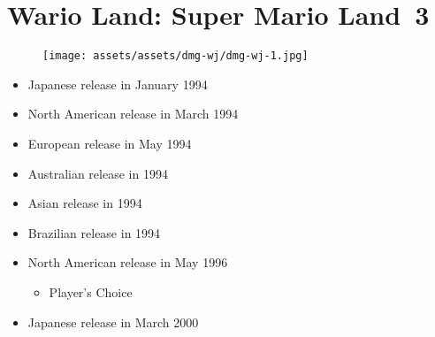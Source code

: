 \documentclass{book}
\begin{document}
\begingroup \chapter*{Wario Land: Super Mario Land 3} \endgroup
\begin{figure}[H]
\vskip 4pt
\centering
\texttt{[image: assets/assets/dmg-wj/dmg-wj-1.jpg]}\end{figure}
\begin{itemize} [nosep]




\item Japanese release in January 1994







\item North American release in March 1994







\item European release in May 1994







\item Australian release in 1994







\item Asian release in 1994







\item Brazilian release in 1994







\item North American release in May 1996
\begin{itemize} [nosep]\item Player’s Choice\end{itemize}\noindent






\item Japanese release in March 2000








\end{itemize}
\end{document}
